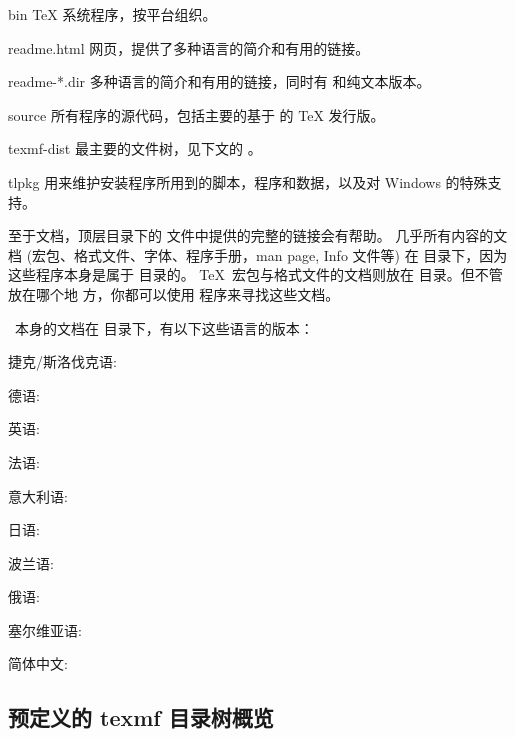 \documentclass{article}
\begin{document}
\begin{ttdescription}
  \item[bin] \TeX{} 系统程序，按平台组织。
  \item[readme.html] 网页，提供了多种语言的简介和有用的链接。
  \item[readme-*.dir] \TL{} 多种语言的简介和有用的链接，同时有 \HTML{}
  和纯文本版本。

  \item[source] 所有程序的源代码，包括主要的基于 \Webc{} 的 \TeX{}
  发行版。
  \item[texmf-dist] 最主要的文件树，见下文的 。
  \item[tlpkg] 用来维护安装程序所用到的脚本，程序和数据，以及对
  Windows 的特殊支持。
\end{ttdescription}

至于文档，顶层目录下的  文件中提供的完整的链接会有帮助。
几乎所有内容的文档 (宏包、格式文件、字体、程序手册，man page, Info 文件等) 在
 目录下，因为这些程序本身是属于  目录的。
\TeX\ 宏包与格式文件的文档则放在  目录。但不管放在哪个地
方，你都可以使用  程序来寻找这些文档。

\TL\ 本身的文档在  目录下，有以下这些语言的版本：

\begin{itemize*}
  \item{捷克/斯洛伐克语:} 
  \item{德语:} 
  \item{英语:} 
  \item{法语:} 
  \item{意大利语:} 
  \item{日语:} 
  \item{波兰语:} 
  \item{俄语:} 
  \item{塞尔维亚语:} 
  \item{简体中文:} 
\end{itemize*}


\subsection{预定义的 texmf 目录树概览}
\label{sec:texmftrees}
\end{document}
